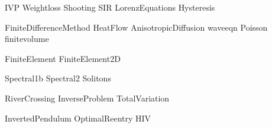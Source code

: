 \documentclass[nociteref]{SIAM-GH-book}
\begin{document}

{IVP}
{Weightloss}
{Shooting}
{SIR}
{LorenzEquations}
{Hysteresis}

{FiniteDifferenceMethod}
{HeatFlow}
{AnisotropicDiffusion}
{waveeqn}
{Poisson}
{finitevolume}


{FiniteElement}
{FiniteElement2D}

{Spectral1b}
{Spectral2}
{Solitons}

{RiverCrossing}
{InverseProblem}
{TotalVariation}

{InvertedPendulum}
{OptimalReentry}
{HIV}
\end{document}
